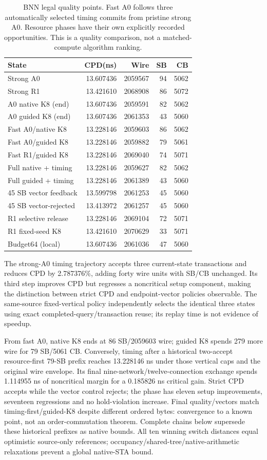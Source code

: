 \documentclass[conference,10pt]{IEEEtran}
\begin{document}
\begin{table}[t]
\centering\caption{BNN legal quality points. Fast A0 follows three automatically selected timing commits from pristine strong A0. Resource phases have their own explicitly recorded opportunities. This is a quality comparison, not a matched-compute algorithm ranking.}
\label{tab:bnn}
\small
\begin{tabular}{lrrrr}\hline
State & CPD(ns) & Wire & SB & CB\\\hline
Strong A0 &13.607436&2059567&94&5062\\
Strong R1 &13.421610&2068908&86&5072\\
A0 native K8 (end) &13.607436&2059591&82&5062\\
A0 guided K8 (end) &13.607436&2061353&43&5060\\
Fast A0/native K8 &13.228146&2059603&86&5062\\
Fast A0/guided K8 &13.228146&2059882&79&5061\\
Fast R1/guided K8 &13.228146&2069040&74&5071\\
Full native + timing &13.228146&2059627&82&5062\\
Full guided + timing &13.228146&2061389&43&5060\\
45 SB vector feedback &13.599798&2061253&45&5060\\
45 SB vector-rejected &13.413972&2061257&45&5060\\
R1 selective release &13.228146&2069104&72&5071\\
R1 fixed-seed K8 &13.421610&2070629&33&5071\\
Budget64 (local) &13.607436&2061036&47&5060\\\hline
\end{tabular}
\end{table}
The strong-A0 timing trajectory accepts three current-state transactions and reduces CPD by 2.787376\%, adding forty wire units with SB/CB unchanged. Its third step improves CPD but regresses a noncritical setup component, making the distinction between strict CPD and endpoint-vector policies observable. The same-source fixed-vertical policy independently selects the identical three states using exact completed-query/transaction reuse; its replay time is not evidence of speedup.

From fast A0, native K8 ends at 86 SB/2059603 wire; guided K8 spends 279 more wire for 79 SB/5061 CB. Conversely, timing after a historical two-accept resource-first 79-SB prefix reaches 13.228146 ns under those vertical caps and the original wire envelope. Its final nine-network/twelve-connection exchange spends 1.114955 ns of noncritical margin for a 0.185826 ns critical gain. Strict CPD accepts while the vector control rejects; the phase has eleven setup improvements, seventeen regressions and no hold-violation increase. Final quality/vectors match timing-first/guided-K8 despite different ordered bytes: convergence to a known point, not an order-commutation theorem. Complete chains below supersede these historical prefixes as native bounds. All ten winning switch distances equal optimistic source-only references; occupancy/shared-tree/native-arithmetic relaxations prevent a global native-STA bound.
\end{document}
